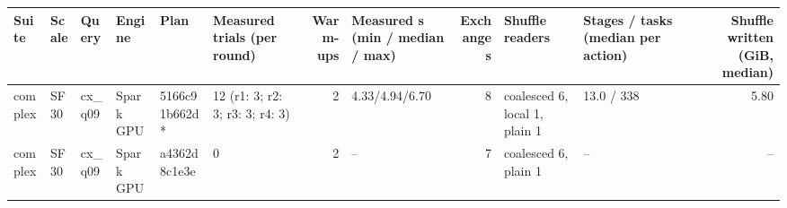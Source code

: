 \begin{longtable}{llllllrlrllr}
\toprule
Suite & Scale & Query & Engine & Plan & Measured trials (per round) & Warm-ups & Measured s (min / median / max) & Exchanges & Shuffle readers & Stages / tasks (median per action) & Shuffle written (GiB, median) \\
\midrule
\endhead
\bottomrule
\endfoot
complex & SF30 & cx\_q09 & Spark GPU & 5166c91b662d * & 12 (r1: 3; r2: 3; r3: 3; r4: 3) & 2 & 4.33/4.94/6.70 & 8 & coalesced 6, local 1, plain 1 & 13.0 / 338 & 5.80 \\
complex & SF30 & cx\_q09 & Spark GPU & a4362d8c1e3e & 0 & 2 & -- & 7 & coalesced 6, plain 1 & -- & -- \\
\end{longtable}
